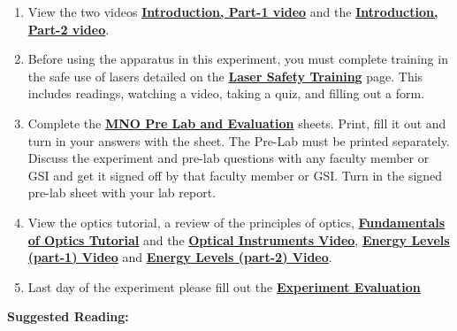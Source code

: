 \documentclass{../lab}
\begin{document}
\begin{enumerate}
    \item View the two videos \href{http://youtu.be/JZJlyaIT3B4}{\textbf{Introduction, Part-1 video}} and the \href{http://youtu.be/h81p2LXkgZY}{\textbf{Introduction, Part-2 video}}.

    \item Before using the apparatus in this experiment, you must complete training in the safe use of lasers detailed on the \href{http://experimentationlab.berkeley.edu/lasersafety}{\textbf{Laser Safety Training}} page. This includes readings, watching a video, taking a quiz, and filling out a form.

    \item Complete the \href{http://experimentationlab.berkeley.edu/MNOprelab}{\textbf{MNO Pre Lab and Evaluation}} sheets. Print, fill it out and turn in your answers with the sheet. The Pre-Lab must be printed separately. Discuss the experiment and pre-lab questions with any faculty member or GSI and get it signed off by that faculty member or GSI. Turn in the signed pre-lab sheet with your lab report.

    \item View the optics tutorial, a review of the principles of optics, \href{http://experimentationlab.berkeley.edu/sites/default/files/ATM/fundamental-Optics.pdf}{\textbf{Fundamentals of Optics Tutorial}} and the \href{http://youtu.be/zUGBt5vc5FA}{\textbf{Optical Instruments Video}}, \href{http://youtu.be/wyBOVjU5bBQ}{\textbf{Energy Levels (part-1) Video}} and \href{http://youtu.be/Eypw0DmVBxk}{\textbf{Energy Levels (part-2) Video}}.

    \item Last day of the experiment please fill out the \href{\ExperimentEvaluation}{\textbf{Experiment Evaluation}}

\end{enumerate}

\textbf{Suggested Reading:}
\end{document}
